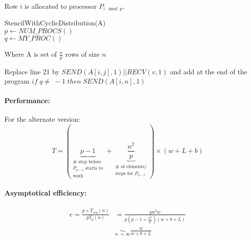 Row $i$ is allocated to processor $P_{i\mod p}$.

\begin{algorithm}[H]
StencilWithCyclicDistribution(A)\\
$p\leftarrow NUM\_PROCS()$\\
$q\leftarrow MY\_PROC()$\\
\end{algorithm}
Where A is  set of $\frac{n}{p}$ rows of size $n$

 Replace line 21 by $SEND(A[i,j],1)||RECV(v,1)$ and add at the end of the program $if\; q\neq \; -1 \; then \;SEND(A[i,n],1)$


\paragraph{Performance:} For the alternate version: 
\[ T=( \underbrace{p-1}_{\substack{\#\text{ step before}\\\text{$P_{p-1}$ starts to}\\\text{work}}}+\underbrace{\frac{n^2}{p}}_{\substack{\# \text{ of elements/}\\\text{steps for $P_{q-1}$}}})\times (w+L+b)\]

\paragraph{Asymptotical efficiency:}
\begin{align*}
e = \frac{p\times T_{seq}(n)}{pT_{p}(n)} & =\frac{pn^2w}{p(p-1+\frac{n^2}{p})(w+b+L)}\\
& \underset{n\to \infty}{\sim} \frac{w}{w+b+L}
\end{align*}


